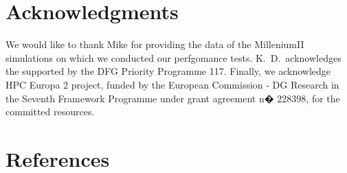 \section*{Acknowledgments}
We would like to thank Mike for providing the data of the MilleniumII simulations 
on which we conducted our perfgomance tests. K.~D.~acknowledges the
supported by the DFG Priority Programme 117. Finally, we acknowledge 
HPC Europa 2 project, funded by the European Commission - 
DG Research in the Seventh Framework Programme under grant agreement n� 228398, 
for the committed resources.

\section*{References}


